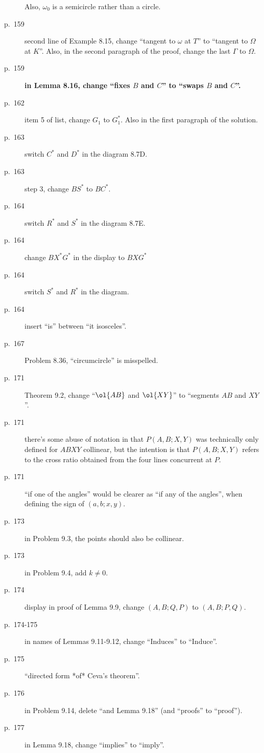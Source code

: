 \documentclass[11pt]{scrartcl}
\newcommand{\crucial}[1]{\textbf{\sffamily\large\color{red} #1}}
\begin{document}
\begin{description}
  Also, $\omega_0$ is a semicircle rather than a circle.
\item[p.\  159] second line of Example 8.15,
  change ``tangent to $\omega$ at $T$'' to ``tangent to $\Omega$ at $K$''.
  Also, in the second paragraph of the proof, change the last $\Gamma$ to $\Omega$.
\item[p.\  159] \crucial{in Lemma 8.16, change ``fixes $B$ and $C$'' to ``swaps $B$ and $C$''.}
\item[p.\  162] item 5 of list, change $G_1$ to $G_1^\ast$.
  Also in the first paragraph of the solution.
\item[p.\  163] switch $C^\ast$ and $D^\ast$ in the diagram 8.7D.
\item[p.\  163] step 3, change $BS^\ast$ to $BC^\ast$.
\item[p.\  164] switch $R^\ast$ and $S^\ast$ in the diagram 8.7E.
\item[p.\  164] change $BX^\ast G^\ast$ in the display to $BXG^\ast$
\item[p.\  164] switch $S^\ast$ and $R^\ast$ in the diagram.
\item[p.\  164] insert ``is'' between ``it isosceles''.
\item[p.\  167] Problem 8.36, ``circumcircle'' is misspelled.
\item[p.\  171] Theorem 9.2, change ``$\ol{AB}$ and $\ol{XY}$'' to ``segments $AB$ and $XY$''.
\item[p.\  171] there's some abuse of notation in that $P(A,B;X,Y)$
  was technically only defined for $ABXY$ collinear,
  but the intention is that $P(A,B;X,Y)$ refers to the cross ratio obtained
  from the four lines concurrent at $P$.
\item[p.\  171] ``if one of the angles'' would be clearer as ``if any of the
  angles'', when defining the sign of $(a,b;x,y)$.
\item[p.\  173] in Problem 9.3, the points should also be collinear.
\item[p.\  173] in Problem 9.4, add $k \neq 0$.
\item[p.\  174] display in proof of Lemma 9.9, change $(A,B;Q,P)$ to $(A,B;P,Q)$.
\item[p.\  174-175] in names of Lemmas 9.11-9.12,
  change ``Induces'' to ``Induce''.
\item[p.\  175] ``directed form *of* Ceva's theorem''.
\item[p.\  176] in Problem 9.14, delete ``and Lemma 9.18'' (and ``proofs'' to ``proof'').
\item[p.\  177] in Lemma 9.18, change ``implies'' to ``imply''.

\end{description}
\end{document}
